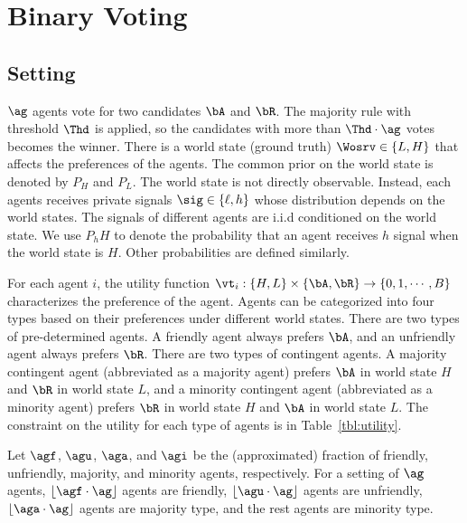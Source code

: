 
\section{Binary Voting}


\subsection{Setting}
$\ag$ agents vote for two candidates $\bA$ and $\bR$. The majority rule with threshold $\Thd$ is applied, so the candidates with more than $\Thd \cdot \ag$ votes becomes the winner. There is a world state (ground truth) $\Wosrv \in \{L, H\}$ that affects the preferences of the agents. The common prior on the world state is denoted by $P_H$ and $P_L$. The world state is not directly observable. Instead, each agents receives private signals $\sig \in \{\ell, h\}$ whose distribution depends on the world states. The signals of different agents are i.i.d conditioned on the world state. We use $P_hH$ to denote the probability that an agent receives $h$ signal when the world state is $H$. Other probabilities are defined similarly. 

For each agent $i$, the utility function $\vt_i: \{H, L\}\times \{\bA, \bR\} \to \{0, 1, \cdots, B\}$ characterizes the preference of the agent. Agents can be categorized into four types based on their preferences under different world states. There are two types of pre-determined agents. A friendly agent always prefers $\bA$, and an unfriendly agent always prefers $\bR$. There are two types of contingent agents. A majority contingent agent (abbreviated as a majority agent) prefers $\bA$ in world state $H$ and $\bR$ in world state $L$, and a minority contingent agent (abbreviated as a minority agent) prefers $\bR$ in world state $H$ and $\bA$ in world state $L$. The constraint on the utility for each type of agents is in Table~\ref{tbl:utility}.

Let $\agf$, $\agu$, $\aga$, and $\agi$ be the (approximated) fraction of friendly, unfriendly, majority, and minority agents, respectively. For a setting of $\ag$ agents, $\lfloor \agf \cdot \ag\rfloor$ agents are friendly, $\lfloor \agu \cdot \ag\rfloor$ agents are unfriendly, $\lfloor \aga \cdot \ag \rfloor$ agents are majority type, and the rest agents are minority type. 

